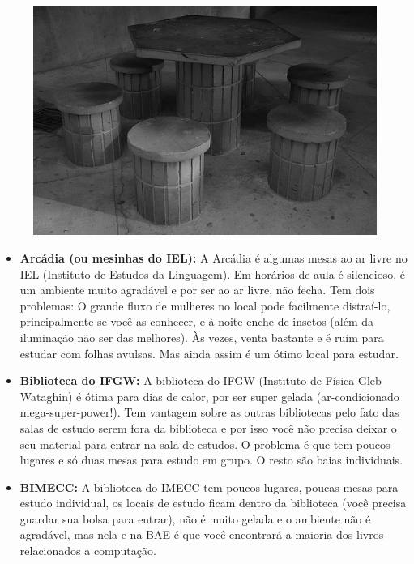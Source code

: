 \begin{figure}[h!]
    \centering
    \includegraphics[scale=0.60, keepaspectratio=true]{img/imgs/11-lugares_estudar/-072.jpg}
\end{figure}
\begin{itemize}
\item  \textbf{Arcádia (ou mesinhas do IEL):} A Arcádia é algumas mesas ao ar livre no IEL (Instituto de Estudos da Linguagem). Em horários de aula é silencioso, é um ambiente muito agradável e por ser ao ar livre, não fecha. Tem dois problemas: O grande fluxo de mulheres no local pode facilmente distraí-lo, principalmente se você as conhecer, e à noite enche de insetos (além da iluminação não ser das melhores). Às vezes, venta bastante e é ruim para estudar com folhas avulsas. Mas ainda assim é um ótimo local para estudar.
\end{itemize}

\begin{itemize}
\item  \textbf{Biblioteca do IFGW:} A biblioteca do IFGW (Instituto de Física Gleb Wataghin) é ótima para dias de calor, por ser super gelada (ar-condicionado mega-super-power!). Tem vantagem sobre as outras bibliotecas pelo fato das salas de estudo serem fora da biblioteca e por isso você não precisa deixar o seu material para entrar na sala de estudos. O problema é que tem poucos lugares e só duas mesas para estudo em grupo. O resto são baias individuais.
\end{itemize}

\begin{itemize}
\item  \textbf{BIMECC:} A biblioteca do IMECC tem poucos lugares, poucas mesas para estudo individual, os locais de estudo ficam dentro da biblioteca (você precisa guardar sua bolsa para entrar), não é muito gelada e o ambiente não é agradável, mas nela e na BAE é que você encontrará a maioria dos livros relacionados a computação.
\end{itemize}

